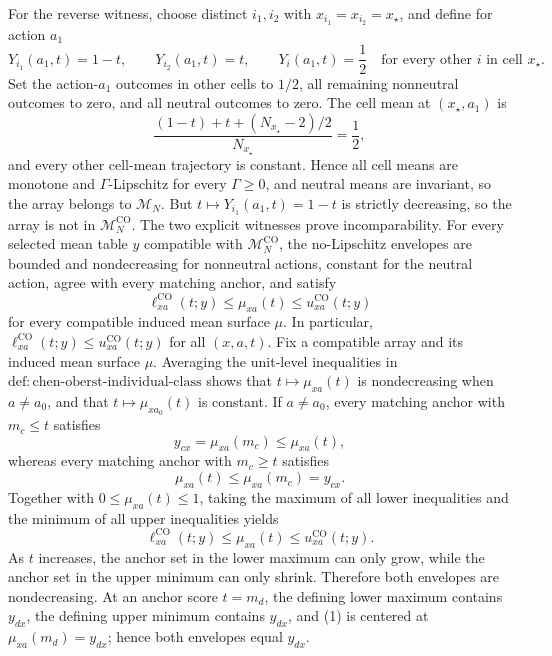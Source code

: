 For the reverse witness, choose distinct \(i_1,i_2\) with \(x_{i_1}=x_{i_2}=x_\star\), and define for action \(a_1\)
\[
Y_{i_1}(a_1,t)=1-t,
\qquad
Y_{i_2}(a_1,t)=t,
\qquad
Y_i(a_1,t)=\frac12
\quad\text{for every other }i\text{ in cell }x_\star.
\]
Set the action-\(a_1\) outcomes in other cells to \(1/2\), all remaining nonneutral outcomes to zero, and all neutral outcomes to zero.  The cell mean at \((x_\star,a_1)\) is
\[
\frac{(1-t)+t+(N_{x_\star}-2)/2}{N_{x_\star}}=\frac12,
\]
and every other cell-mean trajectory is constant.  Hence all cell means are monotone and \(\Gamma\)-Lipschitz for every \(\Gamma\geq0\), and neutral means are invariant, so the array belongs to \(\mathcal M_N\).  But \(t\mapsto Y_{i_1}(a_1,t)=1-t\) is strictly decreasing, so the array is not in \(\mathcal M_N^{\mathrm{CO}}\).  The two explicit witnesses prove incomparability.
For every selected mean table \(y\) compatible with \(\mathcal M_N^{\mathrm{CO}}\), the no-Lipschitz envelopes are bounded and nondecreasing for nonneutral actions, constant for the neutral action, agree with every matching anchor, and satisfy
\[
\ell^{\mathrm{CO}}_{xa}(t;y)\leq\mu_{xa}(t)\leq u^{\mathrm{CO}}_{xa}(t;y)
\]
for every compatible induced mean surface \(\mu\).  In particular, \(\ell^{\mathrm{CO}}_{xa}(t;y)\leq u^{\mathrm{CO}}_{xa}(t;y)\) for all \((x,a,t)\).
Fix a compatible array and its induced mean surface \(\mu\).  Averaging the unit-level inequalities in \(\mathrm{def{:}chen\text{-}oberst\text{-}individual\text{-}class}\) shows that \(t\mapsto\mu_{xa}(t)\) is nondecreasing when \(a\neq a_0\), and that \(t\mapsto\mu_{x a_0}(t)\) is constant.  If \(a\neq a_0\), every matching anchor with \(m_c\leq t\) satisfies
\[
y_{cx}=\mu_{xa}(m_c)\leq\mu_{xa}(t),
\]
whereas every matching anchor with \(m_c\geq t\) satisfies
\[
\mu_{xa}(t)\leq\mu_{xa}(m_c)=y_{cx}.
\]
Together with \(0\leq\mu_{xa}(t)\leq1\), taking the maximum of all lower inequalities and the minimum of all upper inequalities yields
\[
\ell^{\mathrm{CO}}_{xa}(t;y)\leq\mu_{xa}(t)\leq u^{\mathrm{CO}}_{xa}(t;y).
\tag{1}
\]
As \(t\) increases, the anchor set in the lower maximum can only grow, while the anchor set in the upper minimum can only shrink.  Therefore both envelopes are nondecreasing.  At an anchor score \(t=m_d\), the defining lower maximum contains \(y_{dx}\), the defining upper minimum contains \(y_{dx}\), and (1) is centered at \(\mu_{xa}(m_d)=y_{dx}\); hence both envelopes equal \(y_{dx}\).


